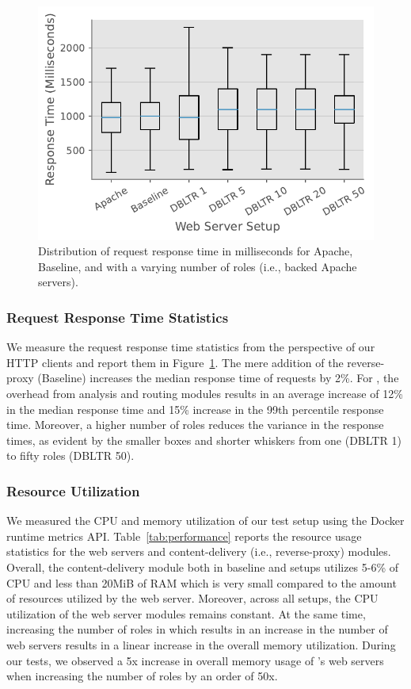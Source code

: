 \begin{figure}[]
    \centering
    \includegraphics[width=0.45
    \textwidth]{figures/dbltr/performance.pdf}
    \caption{Distribution of request response time in milliseconds for Apache, Baseline, and \sys{} with a varying number of roles (i.e., backed Apache servers).}
    \label{fig:performance}
  \end{figure}

\subsubsection{Request Response Time Statistics}
We measure the request response time statistics from the perspective of our HTTP clients and report them in Figure~\ref{fig:performance}. 
The mere addition of the reverse-proxy (Baseline) increases the median response time of requests by 2\%. 
For \sys{}, the overhead from analysis and routing modules results in an average increase of 12\% in the median response time and 15\% increase in the 99th percentile response time. 
Moreover, a higher number of roles reduces the variance in the response times, as evident by the smaller boxes and shorter whiskers from one (DBLTR 1) to fifty roles (DBLTR 50). 

\subsubsection{Resource Utilization}
We measured the CPU and memory utilization of our test setup using the Docker runtime metrics API. 
Table~\ref{tab:performance} reports the resource usage statistics for the web servers and content-delivery (i.e., reverse-proxy) modules. 
Overall, the content-delivery module both in baseline and \sys{} setups utilizes 5-6\% of CPU and less than 20MiB of RAM which is very small compared to the amount of resources utilized by the web server. 
Moreover, across all setups, the CPU utilization of the web server modules remains constant. 
At the same time, increasing the number of roles in \sys{} which results in an increase in the number of web servers results in a linear increase in the overall memory utilization. 
During our tests, we observed a 5x increase in overall memory usage of \sys's web servers when increasing the number of roles by an order of 50x. 


